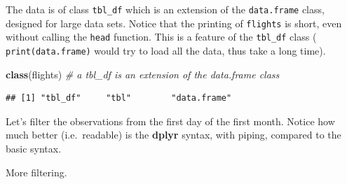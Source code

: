 \documentclass[]{book}
\newenvironment{Shaded}{\begin{snugshade}}{\end{snugshade}}
\newcommand{\KeywordTok}[1]{\textcolor[rgb]{0.13,0.29,0.53}{\textbf{#1}}}
\newcommand{\DecValTok}[1]{\textcolor[rgb]{0.00,0.00,0.81}{#1}}
\newcommand{\StringTok}[1]{\textcolor[rgb]{0.31,0.60,0.02}{#1}}
\newcommand{\CommentTok}[1]{\textcolor[rgb]{0.56,0.35,0.01}{\textit{#1}}}
\newcommand{\OperatorTok}[1]{\textcolor[rgb]{0.81,0.36,0.00}{\textbf{#1}}}
\newcommand{\NormalTok}[1]{#1}
\theoremstyle{definition}
\theoremstyle{definition}
\theoremstyle{definition}
\theoremstyle{remark}
\begin{document}
The data is of class \texttt{tbl\_df} which is an extension of the
\texttt{data.frame} class, designed for large data sets. Notice that the
printing of \texttt{flights} is short, even without calling the
\texttt{head} function. This is a feature of the \texttt{tbl\_df} class
( \texttt{print(data.frame)} would try to load all the data, thus take a
long time).

\begin{Shaded}
\begin{Highlighting}[]
\KeywordTok{class}\NormalTok{(flights) }\CommentTok{# a tbl_df is an extension of the data.frame class}
\end{Highlighting}
\end{Shaded}

\begin{verbatim}
## [1] "tbl_df"     "tbl"        "data.frame"
\end{verbatim}

Let's filter the observations from the first day of the first month.
Notice how much better (i.e.~readable) is the \textbf{dplyr} syntax,
with piping, compared to the basic syntax.

\begin{Shaded}
\end{Shaded}

More filtering.
\end{document}
